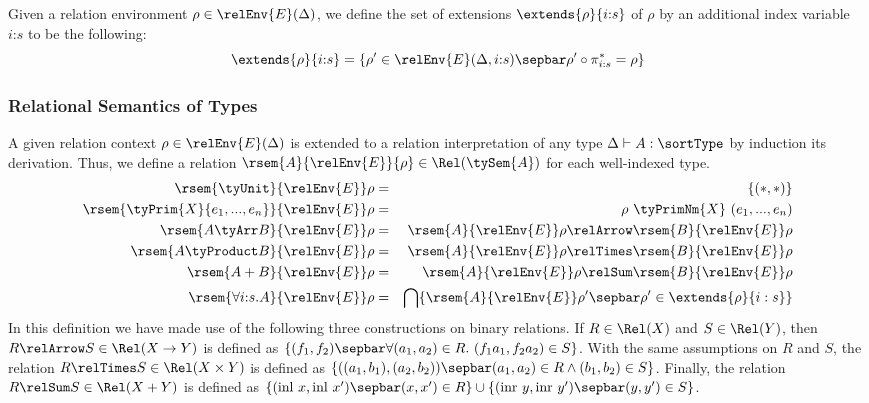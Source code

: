 Given a relation environment $\rho \in \relEnv{E}(\Delta)$, we define
the set of extensions $\extends{\rho}{i\mathord:s}$ of $\rho$ by an
additional index variable $i\mathord:s$ to be the following:
\begin{displaymath}
  \extends{\rho}{i\mathord:s} = \{ \rho' \in \relEnv{E}(\Delta,i\mathord:s) \sepbar \rho' \circ \pi^*_{i\mathord:s} = \rho \}
\end{displaymath}

\subsubsection{Relational Semantics of Types}

A given relation context $\rho \in \relEnv{E}(\Delta)$ is extended to
a relation interpretation of any type $\Delta \vdash A : \sortType$ by
induction its derivation. Thus, we define a relation
$\rsem{A}{\relEnv{E}}{\rho} \in \Rel(\tySem{A})$ for each well-indexed
type.
\begin{eqnarray*}
  \rsem{\tyUnit}{\relEnv{E}}\rho & = & \{(*,*)\} \\
  \rsem{\tyPrim{X}{e_1,...,e_n}}{\relEnv{E}}\rho & = & \rho\ {\tyPrimNm{X}}\ (e_1,...,e_n) \\
  \rsem{A \tyArr B}{\relEnv{E}}\rho & = & \rsem{A}{\relEnv{E}}\rho \relArrow \rsem{B}{\relEnv{E}}\rho \\
  \rsem{A \tyProduct B}{\relEnv{E}}\rho & = & \rsem{A}{\relEnv{E}}\rho \relTimes \rsem{B}{\relEnv{E}}\rho \\
  \rsem{A + B}{\relEnv{E}}\rho & = & \rsem{A}{\relEnv{E}}\rho \relSum \rsem{B}{\relEnv{E}}\rho \\
  \rsem{\forall i\mathord:s.A}{\relEnv{E}}\rho & = & \bigcap\{ \rsem{A}{\relEnv{E}}\rho' \sepbar \rho' \in \extends{\rho}{i:s} \}
\end{eqnarray*}
In this definition we have made use of the following three
constructions on binary relations. If $R \in \Rel(X)$ and $S \in
\Rel(Y)$, then $R \relArrow S \in \Rel(X \to Y)$ is defined as $\{
(f_1,f_2) \sepbar \forall (a_1,a_2) \in R.\ (f_1a_1,f_2a_2) \in S
\}$. With the same assumptions on $R$ and $S$, the relation $R
\relTimes S \in \Rel(X \times Y)$ is defined as $\{
((a_1,b_1),(a_2,b_2)) \sepbar (a_1,a_2) \in R \land (b_1,b_2) \in S
\}$. Finally, the relation $R \relSum S \in \Rel(X + Y)$ is defined as
$\{ (\mathrm{inl}\ x, \mathrm{inl}\ x') \sepbar (x,x') \in R \} \cup
\{ (\mathrm{inr}\ y, \mathrm{inr}\ y') \sepbar (y,y') \in S \}$.

